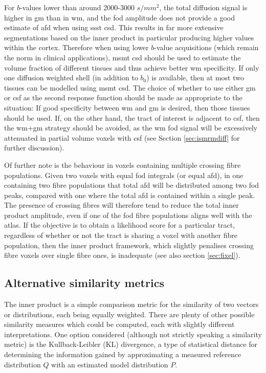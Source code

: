 For $b$-values lower than around 2000-3000 $s/mm^2$, the total diffusion signal is higher in \gls{gm} than in \gls{wm}, and the \gls{fod} amplitude does not provide a good estimate of \gls{afd} when using \gls{ssst} \gls{csd}.
This results in far more extensive segmentations based on the inner product in particular producing higher values within the cortex.
Therefore when using lower $b$-value acquisitions (which remain the norm in clinical applications), \gls{msmt} \gls{csd} should be used to estimate the volume fraction of different tissues and thus achieve better \gls{wm} specificity.
If only one diffusion weighted shell (in addition to $b_0$) is available, then at most two tissues can be modelled using \gls{msmt} \gls{csd}.
The choice of whether to use either \gls{gm} or \gls{csf} as the second response function should be made as appropriate to the situation: If good specificity between \gls{wm} and \gls{gm} is desired, then those tissues should be used.
If, on the other hand, the tract of interest is adjacent to \gls{csf}, then the \gls{wm}+\gls{gm} strategy should be avoided, as the \gls{wm} \gls{fod} signal will be excessively attenuated in partial volume voxels with \gls{csf} (see Section \ref{sec:ismrmdiff} for further discussion).

Of further note is the behaviour in voxels containing multiple crossing fibre populations.
Given two voxels with equal \gls{fod} integrals (or equal \gls{afd}), in one containing two fibre populations that total \gls{afd} will be distributed among two \gls{fod} peaks, compared with one where the total \gls{afd} is contained within a single peak.
The presence of crossing fibres will therefore tend to reduce the total inner product amplitude, even if one of the \gls{fod} fibre populations aligns well with the atlas.
If the objective is to obtain a likelihood score for a particular tract, regardless of whether or not the tract is sharing a voxel with another fibre population, then the inner product framework, which slightly penalises crossing fibre voxels over single fibre ones, is inadequate (see also section \ref{sec:fixel}). %

\subsection{Alternative similarity metrics}

The inner product is a simple comparison metric for the similarity of two vectors or distributions, each being equally weighted.
There are plenty of other possible similarity measures which could be computed, each with slightly different interpretations.
One option considered (although not strictly speaking a similarity metric) is the Kullback-Leibler (KL) divergence, a type of statistical distance for determining the information gained by approximating a measured reference distribution $Q$ with an estimated model distribution $P$.

